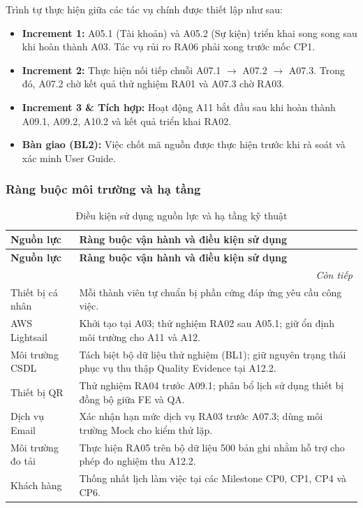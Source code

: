 Trình tự thực hiện giữa các tác vụ chính được thiết lập như sau:
\begin{itemize}
    \item \textbf{Increment 1:} A05.1 (Tài khoản) và A05.2 (Sự kiện) triển khai song song sau khi hoàn thành A03. Tác vụ rủi ro RA06 phải xong trước mốc CP1.
    \item \textbf{Increment 2:} Thực hiện nối tiếp chuỗi A07.1 $\to$ A07.2 $\to$ A07.3. Trong đó, A07.2 chờ kết quả thử nghiệm RA01 và A07.3 chờ RA03.
    \item \textbf{Increment 3 \& Tích hợp:} Hoạt động A11 bắt đầu sau khi hoàn thành A09.1, A09.2, A10.2 và kết quả triển khai RA02.
    \item \textbf{Bàn giao (BL2):} Việc chốt mã nguồn được thực hiện trước khi rà soát và xác minh User Guide.
\end{itemize}

\subsubsection{Ràng buộc môi trường và hạ tầng}

\begingroup\small
\setlength{\tabcolsep}{4pt}\renewcommand{\arraystretch}{1.15}
\begin{longtable}{@{}p{.22\linewidth}p{.70\linewidth}@{}}
\caption{Điều kiện sử dụng nguồn lực và hạ tầng kỹ thuật}\label{tab:shared}\\
\toprule
\textbf{Nguồn lực} & \textbf{Ràng buộc vận hành và điều kiện sử dụng} \\
\midrule\endfirsthead
\toprule
\textbf{Nguồn lực} & \textbf{Ràng buộc vận hành và điều kiện sử dụng} \\
\midrule\endhead
\midrule\multicolumn{2}{r}{\textit{Còn tiếp}}\\\endfoot
\bottomrule\endlastfoot
Thiết bị cá nhân & Mỗi thành viên tự chuẩn bị phần cứng đáp ứng yêu cầu công việc. \\
AWS Lightsail & Khởi tạo tại A03; thử nghiệm RA02 sau A05.1; giữ ổn định môi trường cho A11 và A12. \\
Môi trường CSDL & Tách biệt bộ dữ liệu thử nghiệm (BL1); giữ nguyên trạng thái phục vụ thu thập Quality Evidence tại A12.2. \\
Thiết bị QR & Thử nghiệm RA04 trước A09.1; phân bổ lịch sử dụng thiết bị đồng bộ giữa FE và QA. \\
Dịch vụ Email & Xác nhận hạn mức dịch vụ RA03 trước A07.3; dùng môi trường Mock cho kiểm thử lặp. \\
Môi trường đo tải & Thực hiện RA05 trên bộ dữ liệu 500 bản ghi nhằm hỗ trợ cho phép đo nghiệm thu A12.2. \\
Khách hàng & Thống nhất lịch làm việc tại các Milestone CP0, CP1, CP4 và CP6. \\
\end{longtable}\endgroup

